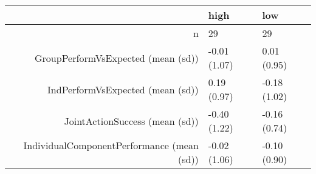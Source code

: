 \begin{table}[ht]
\centering
\begin{tabular}{rll}
  \hline
 & high & low \\ 
  \hline
n &    29 &    29 \\ 
  GroupPerformVsExpected (mean (sd)) & -0.01 (1.07) &  0.01 (0.95) \\ 
  IndPerformVsExpected (mean (sd)) &  0.19 (0.97) & -0.18 (1.02) \\ 
  JointActionSuccess (mean (sd)) & -0.40 (1.22) & -0.16 (0.74) \\ 
  IndividualComponentPerformance (mean (sd)) & -0.02 (1.06) & -0.10 (0.90) \\ 
   \hline
\end{tabular}
\label{tab:performanceConditionPost}
\end{table}
